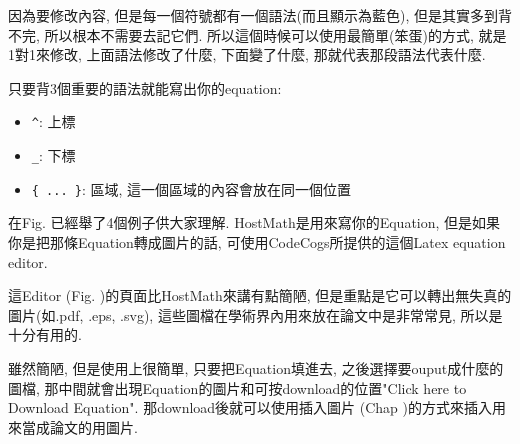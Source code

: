 因為要修改內容, 但是每一個符號都有一個語法(而且顯示為藍色), 但是其實多到背不完, 所以根本不需要去記它們. 所以這個時候可以使用最簡單(笨蛋)的方式, 就是1對1來修改, 上面語法修改了什麼, 下面變了什麼, 那就代表那段語法代表什麼.

只要背3個重要的語法就能寫出你的equation:
  \begin{itemize}
    \item \verb|^|: 上標
    \item \verb|_|: 下標
    \item \verb|{ ... }|: 區域, 這一個區域的內容會放在同一個位置
  \end{itemize}

在Fig. 已經舉了4個例子供大家理解.
\newpage
{}
HostMath是用來寫你的Equation, 但是如果你是把那條Equation轉成圖片的話, 可使用CodeCogs所提供的這個Latex equation editor.

這Editor (Fig. )的頁面比HostMath來講有點簡陋, 但是重點是它可以轉出無失真的圖片(如.pdf, .eps, .svg), 這些圖檔在學術界內用來放在論文中是非常常見, 所以是十分有用的.


雖然簡陋, 但是使用上很簡單, 只要把Equation填進去, 之後選擇要ouput成什麼的圖檔, 那中間就會出現Equation的圖片和可按download的位置"Click here to Download Equation". 那download後就可以使用插入圖片 (Chap )的方式來插入用來當成論文的用圖片.

